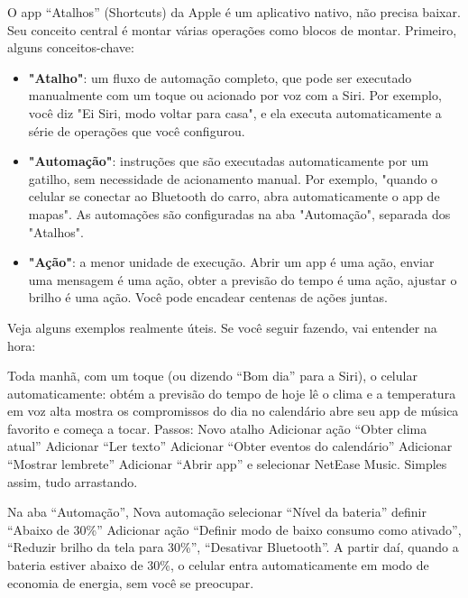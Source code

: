 
O app “Atalhos” (Shortcuts) da Apple é um aplicativo nativo, não precisa baixar. Seu conceito central é montar várias operações como blocos de montar. Primeiro, alguns conceitos-chave:

\begin{itemize}
  \item \textbf{"Atalho"}: um fluxo de automação completo, que pode ser executado manualmente com um toque ou acionado por voz com a Siri. Por exemplo, você diz "Ei Siri, modo voltar para casa", e ela executa automaticamente a série de operações que você configurou.
  \item \textbf{"Automação"}: instruções que são executadas automaticamente por um gatilho, sem necessidade de acionamento manual. Por exemplo, "quando o celular se conectar ao Bluetooth do carro, abra automaticamente o app de mapas". As automações são configuradas na aba "Automação", separada dos "Atalhos".
  \item \textbf{"Ação"}: a menor unidade de execução. Abrir um app é uma ação, enviar uma mensagem é uma ação, obter a previsão do tempo é uma ação, ajustar o brilho é uma ação. Você pode encadear centenas de ações juntas.
\end{itemize}

Veja alguns exemplos realmente úteis. Se você seguir fazendo, vai entender na hora:


Toda manhã, com um toque (ou dizendo “Bom dia” para a Siri), o celular automaticamente: obtém a previsão do tempo de hoje lê o clima e a temperatura em voz alta mostra os compromissos do dia no calendário abre seu app de música favorito e começa a tocar. Passos: Novo atalho Adicionar ação “Obter clima atual” Adicionar “Ler texto” Adicionar “Obter eventos do calendário” Adicionar “Mostrar lembrete” Adicionar “Abrir app” e selecionar NetEase Music. Simples assim, tudo arrastando.


Na aba “Automação”, Nova automação selecionar “Nível da bateria” definir “Abaixo de 30\%” Adicionar ação “Definir modo de baixo consumo como ativado”, “Reduzir brilho da tela para 30\%”, “Desativar Bluetooth”. A partir daí, quando a bateria estiver abaixo de 30\%, o celular entra automaticamente em modo de economia de energia, sem você se preocupar.

